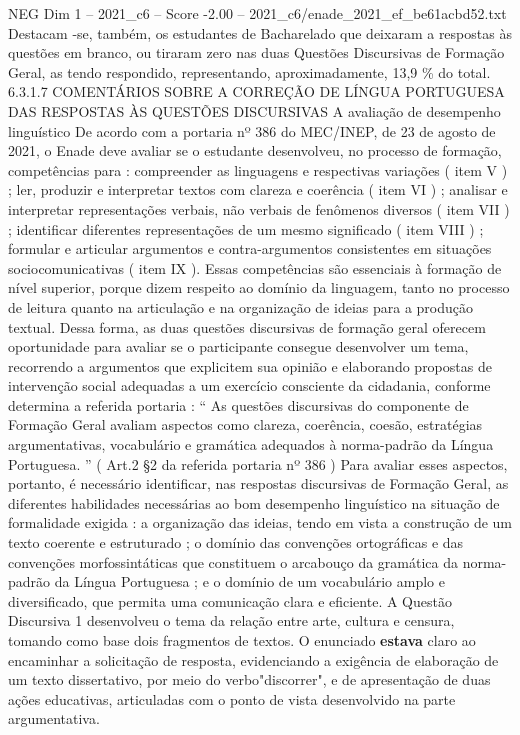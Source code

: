 \begin{textsample}{NEG Dim 1 – 2021\_c6 – Score -2.00 – 2021\_c6/enade\_2021\_ef\_be61acbd52.txt}
Destacam -se, também, os estudantes de Bacharelado que deixaram a respostas às questões em branco, ou tiraram zero nas duas Questões Discursivas de Formação Geral, as tendo respondido, representando, aproximadamente, 13,9 \% do total. 6.3.1.7 COMENTÁRIOS SOBRE A CORREÇÃO DE LÍNGUA PORTUGUESA DAS RESPOSTAS ÀS QUESTÕES DISCURSIVAS A avaliação de desempenho linguístico De acordo com a portaria nº 386 do MEC/INEP, de 23 de agosto de 2021, o Enade deve avaliar se o estudante desenvolveu, no processo de formação, competências para : compreender as linguagens e respectivas variações ( item V ) ; ler, produzir e interpretar textos com clareza e coerência ( item VI ) ; analisar e interpretar representações verbais, não verbais de fenômenos diversos ( item VII ) ; identificar diferentes representações de um mesmo significado ( item VIII ) ; formular e articular argumentos e contra-argumentos consistentes em situações sociocomunicativas ( item IX ).
Essas competências são essenciais à formação de nível superior, porque dizem respeito ao domínio da linguagem, tanto no processo de leitura quanto na articulação e na organização de ideias para a produção textual.
Dessa forma, as duas questões discursivas de formação geral oferecem oportunidade para avaliar se o participante consegue desenvolver um tema, recorrendo a argumentos que explicitem sua opinião e elaborando propostas de intervenção social adequadas a um exercício consciente da cidadania, conforme determina a referida portaria : “ As questões discursivas do componente de Formação Geral avaliam aspectos como clareza, coerência, coesão, estratégias argumentativas, vocabulário e gramática adequados à norma-padrão da Língua Portuguesa. ” ( Art.2 §2 da referida portaria nº 386 ) Para avaliar esses aspectos, portanto, é necessário identificar, nas respostas discursivas de Formação Geral, as diferentes habilidades necessárias ao bom desempenho linguístico na situação de formalidade exigida : a organização das ideias, tendo em vista a construção de um texto coerente e estruturado ; o domínio das convenções ortográficas e das convenções morfossintáticas que constituem o arcabouço da gramática da norma-padrão da Língua Portuguesa ; e o domínio de um vocabulário amplo e diversificado, que permita uma comunicação clara e eficiente.
A Questão Discursiva 1 desenvolveu o tema da relação entre arte, cultura e censura, tomando como base dois fragmentos de textos.
O enunciado \textbf{estava} claro ao encaminhar a solicitação de resposta, evidenciando a exigência de elaboração de um texto dissertativo, por meio do verbo"discorrer", e de apresentação de duas ações educativas, articuladas com o ponto de vista desenvolvido na parte argumentativa.

\end{textsample}
